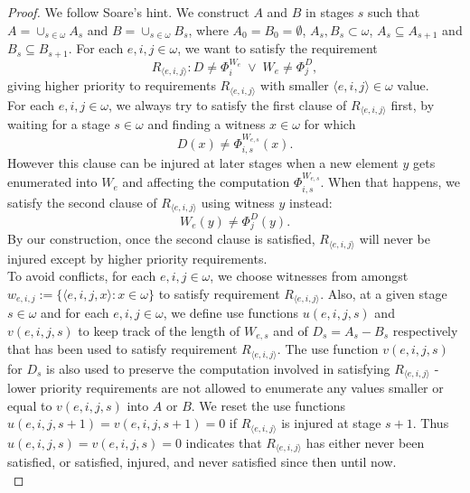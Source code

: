 \documentclass{article}
\begin{document}
  \begin{proof}
    We follow Soare's hint. We construct $A$ and $B$ in stages $s$ such
    that $A=\cup_{s\in\omega}A_s$ and $B=\cup_{s\in\omega}B_s$, where
    $A_0=B_0=\emptyset$, $A_s,B_s\subset\omega$, $A_s\subseteq A_{s+1}$ and
    $B_s\subseteq B_{s+1}$. For each $e,i,j\in\omega$, we want to satisfy
    the requirement
    \begin{equation}
      R_{\langle e,i,j\rangle}: D\neq \Phi_i^{W_e}\; \vee\;
      W_e\neq\Phi_j^D,
      \label{eq:requirement}
    \end{equation}
    giving higher priority to requirements $R_{\langle e,i,j\rangle}$ with
    smaller $\langle e,i,j\rangle\in\omega$ value. \\

    For each $e,i,j\in\omega$, we always try to satisfy the first clause
    of $R_{\langle e,i,j\rangle}$ first, by waiting for a stage
    $s\in\omega$ and finding a witness $x\in\omega$ for which
    \[D(x) \neq \Phi_{i,s}^{W_{e,s}}(x).\]
    However this clause can be injured at later stages when a new element
    $y$ gets enumerated into $W_e$ and affecting the computation
    $\Phi_{i,s}^{W_{e,s}}$. When that happens, we satisfy the second clause
    of $R_{\langle e,i,j\rangle}$ using witness $y$ instead: 
    \[W_e(y) \neq \Phi_j^D(y).\]
    By our construction, once the second clause is satisfied, $R_{\langle
    e,i,j\rangle}$ will never be injured except by higher priority
    requirements. \\

    To avoid conflicts, for each $e,i,j\in\omega$, we choose witnesses from
    amongst $w_{e,i,j}:=\{\langle e,i,j,x\rangle: x\in\omega\}$ to satisfy
    requirement $R_{\langle e,i,j\rangle}$. Also, at a given stage
    $s\in\omega$ and for each $e,i,j\in\omega$, we define use functions
    $u(e,i,j,s)$ and $v(e,i,j,s)$ to keep track of the length of $W_{e,s}$
    and of $D_s=A_s-B_s$ respectively that has been used to satisfy
    requirement $R_{\langle e,i,j\rangle}$. The use function $v(e,i,j,s)$
    for $D_s$ is also used to preserve the computation involved in
    satisfying $R_{\langle e,i,j\rangle}$ - lower priority requirements are
    not allowed to enumerate any values smaller or equal to $v(e,i,j,s)$
    into $A$ or $B$. We reset the use functions
    $u(e,i,j,s+1)=v(e,i,j,s+1)=0$ if $R_{\langle e,i,j\rangle}$ is injured
    at stage $s+1$. Thus $u(e,i,j,s)=v(e,i,j,s)=0$ indicates that
    $R_{\langle e,i,j\rangle}$ has either never been satisfied, or
    satisfied, injured, and never satisfied since then until now. \\


\end{proof}
\end{document}
